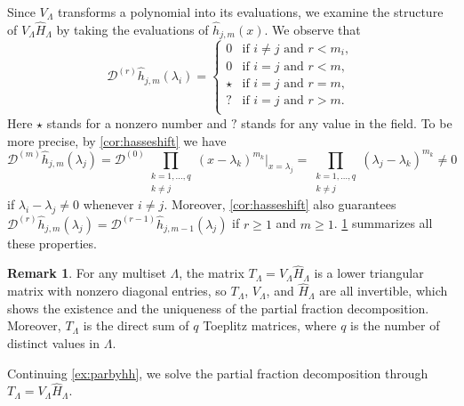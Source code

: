 \documentclass{article}
\theoremstyle{definition}
\newtheorem{remark}[theorem]{Remark}
\begin{document}
Since $V_\Lambda$ transforms a polynomial into its evaluations, we examine the structure of $V_\Lambda \hat{H}_\Lambda$ by taking the evaluations of $\hat{h}_{j,m}(x)$.  We observe that
\[
    \mathcal{D}^{(r)}\hat{h}_{j,m}(\lambda_i) = 
    \begin{cases}
        0 & \text{if } i\neq j \text{ and } r < m_i, \\
        0 & \text{if } i = j \text{ and } r < m, \\
        \star & \text{if } i = j \text{ and } r = m, \\
        ? & \text{if } i = j \text{ and } r > m. \\
    \end{cases}
\]
Here $\star$ stands for a nonzero number and $?$ stands for any value in the field.  To be more precise, by \cref{cor:hasseshift} we have
\[
    \mathcal{D}^{(m)}\hat{h}_{j,m}(\lambda_j) =
    \mathcal{D}^{(0)} \prod_{\substack{k = 1, \ldots, q\\ k\neq j}} (x - \lambda_k)^{m_k} \Big|_{x = \lambda_j} = 
    \prod_{\substack{k = 1, \ldots, q\\ k\neq j}}
    (\lambda_j - \lambda_k)^{m_k} \neq 0
\]
if $\lambda_i - \lambda_j \ne 0$ whenever $i\ne j$.  Moreover, \cref{cor:hasseshift} also guarantees $\mathcal{D}^{(r)}\hat{h}_{j,m}(\lambda_j) = \mathcal{D}^{(r-1)}\hat{h}_{j,m-1}(\lambda_j)$ if $r \geq 1$ and $m \geq 1$.  \cref{rem:Tstruc} summarizes all these properties.  

\begin{remark}
\label{rem:Tstruc}
For any multiset $\Lambda$, the matrix $T_\Lambda = V_\Lambda \hat{H}_\Lambda$ is a lower triangular matrix with nonzero diagonal entries, so $T_\Lambda$, $V_\Lambda$, and $\hat{H}_\Lambda$ are all invertible, which shows the existence and the uniqueness of the partial fraction decomposition.  Moreover, $T_\Lambda$ is the direct sum of $q$ Toeplitz matrices, where $q$ is the number of distinct values in $\Lambda$.
\end{remark}

Continuing \cref{ex:parbyhh}, we solve the partial fraction decomposition through $T_\Lambda = V_\Lambda \hat{H}_\Lambda$.  
\end{document}
